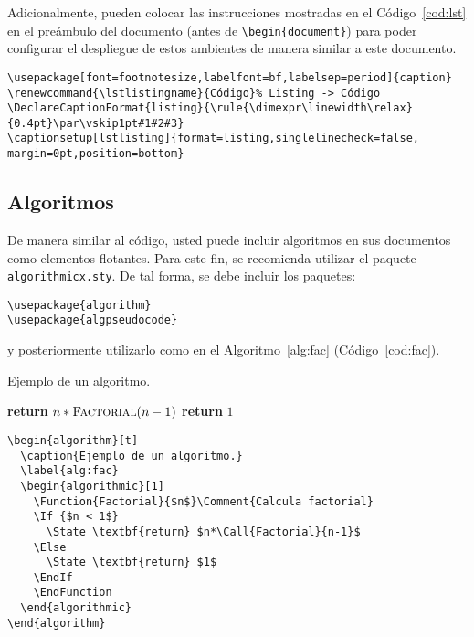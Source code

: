 \documentclass[twocolumn,11pts]{IEEEtran}
\renewcommand{\lstlistingname}{Código}%
\begin{document}
Adicionalmente, pueden colocar las instrucciones mostradas en el Código~\ref{cod:lst} en el preámbulo del documento (antes de \verb|\begin{document}|) para poder configurar el despliegue de estos ambientes de manera similar a este documento.

\begin{lstlisting}[float=tb,caption={Instrucciones que configuran el paquete \texttt{listings.sty}.},label=cod:lst]
\usepackage[font=footnotesize,labelfont=bf,labelsep=period]{caption}
\renewcommand{\lstlistingname}{Código}% Listing -> Código
\DeclareCaptionFormat{listing}{\rule{\dimexpr\linewidth\relax}{0.4pt}\par\vskip1pt#1#2#3}
\captionsetup[lstlisting]{format=listing,singlelinecheck=false, margin=0pt,position=bottom}
\end{lstlisting}

\subsection{Algoritmos}

De manera similar al código, usted puede incluir algoritmos en sus documentos como elementos flotantes. Para este fin, se recomienda utilizar el paquete \texttt{algorithmicx.sty}. De tal forma, se debe incluir los paquetes:
\begin{lstlisting}[frame=none,numbers=none,basicstyle=\tt\normalsize]
\usepackage{algorithm}
\usepackage{algpseudocode}
\end{lstlisting}
y posteriormente utilizarlo como en el Algoritmo~\ref{alg:fac} (Código~\ref{cod:fac}).

\begin{algorithm}[t]
  \caption{Ejemplo de un algoritmo.}
  \label{alg:fac}
  \begin{algorithmic}[1]
      \State \textbf{return} $n*\Call{Factorial}{n-1}$
    \Else
      \State \textbf{return} $1$
    \EndIf
    \EndFunction
  \end{algorithmic}
\end{algorithm}

\begin{lstlisting}[float=tb,caption={Código que genera el Algoritmo~\ref{alg:fac}.},label=cod:fac]
\begin{algorithm}[t]
  \caption{Ejemplo de un algoritmo.}
  \label{alg:fac}
  \begin{algorithmic}[1]
    \Function{Factorial}{$n$}\Comment{Calcula factorial}
    \If {$n < 1$}
      \State \textbf{return} $n*\Call{Factorial}{n-1}$
    \Else
      \State \textbf{return} $1$
    \EndIf
    \EndFunction
  \end{algorithmic}
\end{algorithm}
\end{lstlisting}
\end{document}
